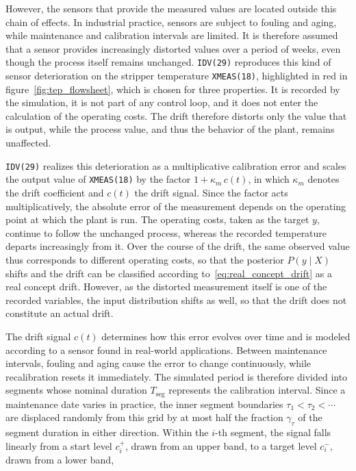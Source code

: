 %
However, the sensors that provide the measured values are located outside this chain of effects. In industrial practice, sensors are subject to fouling and aging, while maintenance and calibration intervals are limited. It is therefore assumed that a sensor provides increasingly distorted values over a period of weeks, even though the process itself remains unchanged. \texttt{IDV(29)} reproduces this kind of sensor deterioration on the stripper temperature \texttt{XMEAS(18)}, highlighted in red in figure~\ref{fig:tep_flowsheet}, which is chosen for three properties. It is recorded by the simulation, it is not part of any control loop, and it does not enter the calculation of the operating costs. The drift therefore distorts only the value that is output, while the process value, and thus the behavior of the plant, remains unaffected. \par
%
\texttt{IDV(29)} realizes this deterioration as a multiplicative calibration error and scales the output value of \texttt{XMEAS(18)} by the factor $1 + \kappa_m\, c(t)$, in which $\kappa_m$ denotes the drift coefficient and $c(t)$ the drift signal. Since the factor acts multiplicatively, the absolute error of the measurement depends on the operating point at which the plant is run. The operating costs, taken as the target $y$, continue to follow the unchanged process, whereas the recorded temperature departs increasingly from it. Over the course of the drift, the same observed value thus corresponds to different operating costs, so that the posterior $P(y \mid X)$ shifts and the drift can be classified according to~\eqref{eq:real_concept_drift} as a real concept drift. However, as the distorted measurement itself is one of the recorded variables, the input distribution shifts as well, so that the drift does not constitute an actual drift. \par
%
The drift signal $c(t)$ determines how this error evolves over time and is modeled according to a sensor found in real-world applications. Between maintenance intervals, fouling and aging cause the error to change continuously, while recalibration resets it immediately. The simulated period is therefore divided into segments whose nominal duration $T_{\mathrm{seg}}$ represents the calibration interval. Since a maintenance date varies in practice, the inner segment boundaries $\tau_1 < \tau_2 < \cdots$ are displaced randomly from this grid by at most half the fraction $\gamma_\tau$ of the segment duration in either direction. Within the $i$-th segment, the signal falls linearly from a start level $c_i^{+}$, drawn from an upper band, to a target level $c_i^{-}$, drawn from a lower band,

